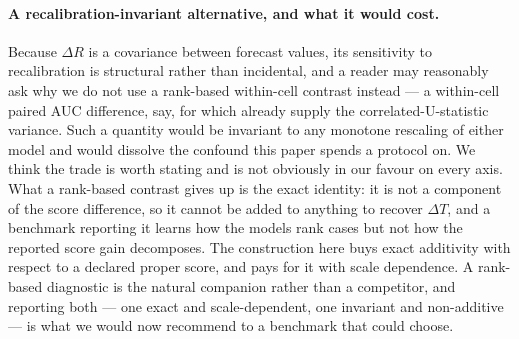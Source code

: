 \documentclass[preprint,times,10pt,a4paper]{elsarticle}
\theoremstyle{plain}
\theoremstyle{definition}
\begin{document}
\paragraph{A recalibration-invariant alternative, and what it would cost.}
Because $\Delta R$ is a covariance between forecast values, its sensitivity to
recalibration is structural rather than incidental, and a reader may reasonably ask why we
do not use a rank-based within-cell contrast instead --- a within-cell paired AUC
difference, say, for which \citet{delong1988comparing} already supply the
correlated-U-statistic variance. Such a quantity would be invariant to any monotone
rescaling of either model and would dissolve the confound this paper spends a protocol on.
We think the trade is worth stating and is not obviously in our favour on every axis.
What a rank-based contrast gives up is the exact identity: it is not a component of the
score difference, so it cannot be added to anything to recover $\Delta T$, and a benchmark
reporting it learns how the models rank cases but not how the reported score gain
decomposes. The construction here buys exact additivity with respect to a declared proper
score, and pays for it with scale dependence. A rank-based diagnostic is the natural
companion rather than a competitor, and reporting both --- one exact and scale-dependent,
one invariant and non-additive --- is what we would now recommend to a benchmark that
could choose.
\end{document}
